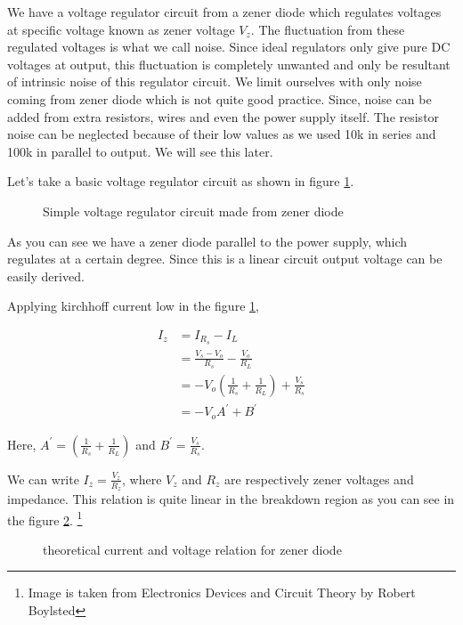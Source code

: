 \documentclass[12pt]{article}
\begin{document}
We have a voltage regulator circuit from a zener diode which regulates voltages at specific voltage known as zener voltage $V_{z}$. The fluctuation from these regulated voltages is what we call noise. Since ideal regulators only give pure DC voltages at output, this fluctuation is completely unwanted and only be resultant of intrinsic noise of this regulator circuit.  We limit ourselves with only noise coming from zener diode which is not quite good practice. Since, noise can be added from extra resistors, wires and even the power supply itself. The resistor noise can be neglected because of their low values as we used 10k in series and 100k in parallel to output. We will see this later.

Let’s take a basic voltage regulator circuit as shown in figure \ref{thcir1}.

\begin{figure}[hbt!]
\caption{Simple voltage regulator circuit made from zener diode \label{thcir1}}
\end{figure}

As you can see we have a zener diode parallel to the power supply, which regulates at a certain degree. Since this is a linear circuit output voltage can be easily derived.

Applying kirchhoff current low in the figure \ref{thcir1},


\begin{align*}
I_{z} & = I_{R_s} -I_{L}\\
& = \frac{V_s-V_o}{R_s}-\frac{V_o}{R_L}\\
& = -V_o(\frac{1}{R_s}+\frac{1}{R_L})+ \frac{V_s}{R_s}\\
& = -V_oA^{\prime}+B^{\prime}
\end{align*}

Here, $A^{\prime} = (\frac{1}{R_s}+\frac{1}{R_L})$ and $B^{\prime} = \frac{V_s}{R_s}$.  

We can write $I_z = \frac{V_z}{R_z}$, where $V_z$ and $R_z$ are respectively zener voltages and impedance.  This relation is quite linear in the breakdown region as you can see in the figure \ref{thiv}. \footnote{Image is taken from Electronics Devices and Circuit Theory by Robert Boylsted}

\begin{figure}[hbt!]
\caption{theoretical current and voltage relation for zener diode \label{thiv}}
\end{figure}
\end{document}
